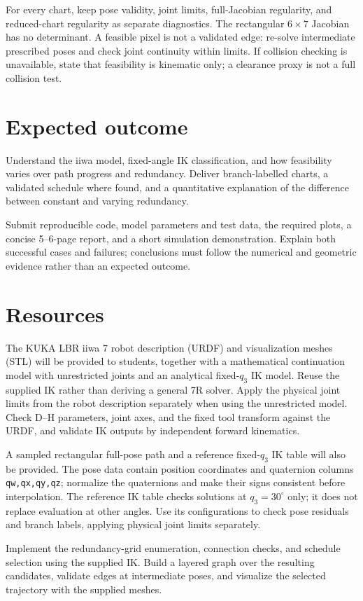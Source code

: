 \documentclass[11pt,a4paper]{article}
\begin{document}
For every chart, keep pose validity, joint limits,
full-Jacobian regularity, and reduced-chart regularity as separate diagnostics.
The rectangular $6\times7$ Jacobian has no determinant. A feasible pixel is
not a validated edge: re-solve intermediate prescribed poses and check joint
continuity within limits. If collision checking is unavailable, state that
feasibility is kinematic only; a clearance proxy is not a full collision test.

\section*{Expected outcome}
Understand the iiwa model, fixed-angle IK classification, and how
feasibility varies over path progress and redundancy. Deliver branch-labelled
charts, a validated schedule where found, and a quantitative explanation of
the difference between constant and varying redundancy.

Submit reproducible code, model parameters and test data, the required plots,
a concise 5--6-page report, and a short simulation demonstration. Explain
both successful cases and failures; conclusions must follow the numerical
and geometric evidence rather than an expected outcome.

\section*{Resources}
The KUKA LBR iiwa 7 robot description (URDF) and visualization meshes
(STL) will be provided to students, together with a mathematical continuation
model with unrestricted joints and an analytical fixed-$q_3$ IK model. Reuse
the supplied IK rather than deriving a general 7R solver. Apply the physical
joint limits from the robot description separately when using the unrestricted
model. Check D--H parameters, joint axes, and the fixed tool transform against
the URDF, and validate IK outputs by independent forward kinematics.

A sampled rectangular full-pose path and a reference fixed-$q_3$ IK
table will also be provided. The pose data contain position coordinates and
quaternion columns \texttt{qw,qx,qy,qz}; normalize the quaternions and make
their signs consistent before interpolation. The reference IK table checks
solutions at $q_3=30^\circ$ only; it does not replace evaluation at other angles.
Use its configurations to check pose residuals and branch labels, applying
physical joint limits separately.

Implement the redundancy-grid enumeration, connection checks, and schedule
selection using the supplied IK. Build a layered graph over the resulting
candidates, validate edges at intermediate poses, and visualize the selected
trajectory with the supplied meshes.
\end{document}

